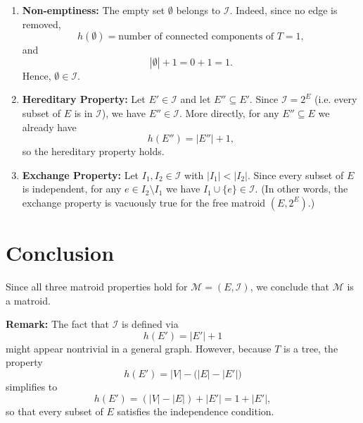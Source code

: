 \documentclass[letterpaper, 11pt]{article}
\newcommand{\1}{\mathds{1}}	%
\theoremstyle{definition}
\begin{document}
\begin{enumerate}
    \item \textbf{Non-emptiness:}  
    The empty set \(\emptyset\) belongs to \(\mathcal{I}\). Indeed, since no edge is removed,
    \[
    h(\emptyset) = \text{number of connected components of }T = 1,
    \]
    and
    \[
    |\emptyset|+1=0+1=1.
    \]
    Hence, \(\emptyset\in \mathcal{I}\).

    \item \textbf{Hereditary Property:}  
    Let \(E'\in \mathcal{I}\) and let \(E''\subseteq E'\). Since \(\mathcal{I}=2^E\) (i.e. every subset of \(E\) is in \(\mathcal{I}\)), we have \(E''\in \mathcal{I}\). More directly, for any \(E''\subseteq E\) we already have
    \[
    h(E'') = |E''|+1,
    \]
    so the hereditary property holds.

    \item \textbf{Exchange Property:}  
    Let \(I_1,I_2\in \mathcal{I}\) with \(|I_1|<|I_2|\). Since every subset of \(E\) is independent, for any \(e\in I_2\setminus I_1\) we have \(I_1\cup\{e\}\in \mathcal{I}\). (In other words, the exchange property is vacuously true for the free matroid \((E,2^E)\).)
\end{enumerate}

\section*{Conclusion}

Since all three matroid properties hold for \(\mathcal{M}=(E,\mathcal{I})\), we conclude that \(\mathcal{M}\) is a matroid.

\bigskip

\noindent\textbf{Remark:} The fact that \(\mathcal{I}\) is defined via 
\[
h(E')=|E'|+1
\]
might appear nontrivial in a general graph. However, because \(T\) is a tree, the property
\[
h(E') = |V| - \bigl(|E|-|E'|\bigr)
\]
simplifies to
\[
h(E') = (|V| - |E|) + |E'| = 1 + |E'|,
\]
so that every subset of \(E\) satisfies the independence condition.
\end{document}
